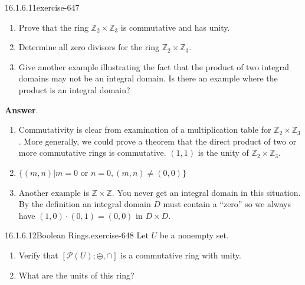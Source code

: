 \documentclass[twoside,10pt,]{book}
\numberwithin{equation}{section}
\begin{document}
\begin{divisionsolution}{16.1.6.11}{}{exercise-647}%
\hypertarget{p-5833}{}%
\leavevmode%
\begin{enumerate}[label=(\alph*)]
\item\hypertarget{li-2579}{}\hypertarget{p-5834}{}%
Prove that the ring \(\mathbb{Z}_2 \times \mathbb{Z}_3\) is commutative and has unity.%
\item\hypertarget{li-2580}{}\hypertarget{p-5835}{}%
Determine all zero divisors for the ring \(\mathbb{Z}_2 \times \mathbb{Z}_3\).%
\item\hypertarget{li-2581}{}\hypertarget{p-5836}{}%
Give another example illustrating the fact that the product of two integral domains may not be an integral domain. Is there an example where the product is an integral domain?%
\end{enumerate}
%
\par\smallskip%
\noindent\textbf{Answer}.\quad%
\hypertarget{p-5837}{}%
\leavevmode%
\begin{enumerate}[label=(\alph*)]
\item\hypertarget{li-2582}{}\hypertarget{p-5838}{}%
Commutativity is clear from examination of a multiplication table for \(\mathbb{Z}_2\times  \mathbb{Z}_3\). More generally, we could prove a theorem that the direct product of two or more commutative rings is commutative. \((1, 1)\) is the unity of \(\mathbb{Z}_2\times  \mathbb{Z}_3\).%
\item\hypertarget{li-2583}{}\hypertarget{p-5839}{}%
\(\{(m, n) | m = 0 \textrm{ or } n = 0, (m, n) \neq  (0, 0)\}\)%
\item\hypertarget{li-2584}{}\hypertarget{p-5840}{}%
Another example is \(\mathbb{Z} \times  \mathbb{Z}\).  You never get an integral domain in this situation. By the definition an integral domain \(D\) must contain a ``zero''  so we always have \((1, 0) \cdot  (0, 1) = (0, 0)\) in \(D \times  D\).%
\end{enumerate}
%
\end{divisionsolution}%
\begin{divisionsolution}{16.1.6.12}{Boolean Rings.}{exercise-648}%
\hypertarget{p-5841}{}%
Let \(U\) be a nonempty set.\leavevmode%
\begin{enumerate}[label=(\alph*)]
\item\hypertarget{li-2585}{}\hypertarget{p-5842}{}%
Verify that \([\mathcal{P}(U);\oplus ,\cap ]\) is a commutative ring with unity.%
\item\hypertarget{li-2586}{}\hypertarget{p-5843}{}%
What are the units of this ring?%
\end{enumerate}
%
\end{divisionsolution}%
\end{document}
